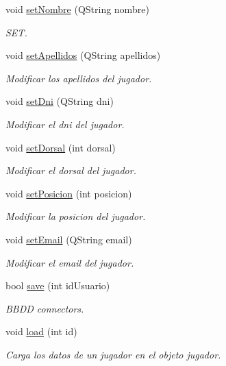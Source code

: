 \begin{DoxyCompactItemize}
void \mbox{\hyperlink{classJugador_a66ae18a593fe618962a7c78fa201712a}{set\+Nombre}} (Q\+String nombre)
\begin{DoxyCompactList}\small\item\em S\+ET. \end{DoxyCompactList}\item 
void \mbox{\hyperlink{classJugador_ad272be7c6b113eee1c9baf1262c4ad95}{set\+Apellidos}} (Q\+String apellidos)
\begin{DoxyCompactList}\small\item\em Modificar los apellidos del jugador. \end{DoxyCompactList}\item 
void \mbox{\hyperlink{classJugador_af2b5ddb5d0b2cc80867ba54cf4cea564}{set\+Dni}} (Q\+String dni)
\begin{DoxyCompactList}\small\item\em Modificar el dni del jugador. \end{DoxyCompactList}\item 
void \mbox{\hyperlink{classJugador_a08e9a676f4710c0635d02e129d7cb7d0}{set\+Dorsal}} (int dorsal)
\begin{DoxyCompactList}\small\item\em Modificar el dorsal del jugador. \end{DoxyCompactList}\item 
void \mbox{\hyperlink{classJugador_a0b56f6473a446c7dd2c649dfc2d7cdea}{set\+Posicion}} (int posicion)
\begin{DoxyCompactList}\small\item\em Modificar la posicion del jugador. \end{DoxyCompactList}\item 
void \mbox{\hyperlink{classJugador_abe37872318ab13c0b6043302eb31082c}{set\+Email}} (Q\+String email)
\begin{DoxyCompactList}\small\item\em Modificar el email del jugador. \end{DoxyCompactList}\item 
bool \mbox{\hyperlink{classJugador_aeeb38c07c438551fd1d43a963e3b0b15}{save}} (int id\+Usuario)
\begin{DoxyCompactList}\small\item\em B\+B\+DD connectors. \end{DoxyCompactList}\item 
void \mbox{\hyperlink{classJugador_a500d0e508636a711ae941b7557641c1a}{load}} (int id)
\begin{DoxyCompactList}\small\item\em Carga los datos de un jugador en el objeto jugador. \end{DoxyCompactList}\item 

\end{DoxyCompactItemize}
